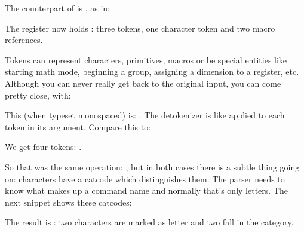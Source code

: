 The counterpart of \type {\normalexpanded} is \type {\normalunexpanded}, as in:

\startbuffer
\def\MyMacroA{a}
\def\MyMacroB{b}
\normalprotected{}
\normalexpanded {\scratchtoks
    {\MyMacroA\normalunexpanded {\MyMacroB}\MyMacroC}}
\stopbuffer

\typebuffer[option=TEX] \getbuffer

The register now holds \MyShow: three tokens, one character token and two
macro references.

Tokens can represent characters, primitives, macros or be special entities like
starting math mode, beginning a group, assigning a dimension to a register, etc.
Although you can never really get back to the original input, you can come pretty
close, with:

\startbuffer
{}
\stopbuffer

\typebuffer[option=TEX]

This (when typeset monospaced) is: {\tt \inlinebuffer}. The detokenizer is like
\type {\string} applied to each token in its argument. Compare this to:

\startbuffer
\normalexpanded {
    \normaldetokenize{10pt}
}
\stopbuffer

\typebuffer[option=TEX]

We get four tokens: {\tt\inlinebuffer}.

\startbuffer
{}
\stopbuffer

\typebuffer[option=TEX]

So that was the same operation: {\tt\inlinebuffer}, but in both cases there is a
subtle thing going on: characters have a catcode which distinguishes them. The
parser needs to know what makes up a command name and normally that's only
letters. The next snippet shows these catcodes:

\startbuffer
{}
\stopbuffer

\typebuffer[option=TEX]

The result is \quotation {\tt\inlinebuffer}: two characters are marked as \quote
{letter} and two fall in the  category.

\stopsectionlevel

\startsectionlevel[title={\LUATEX\ primitives}]


